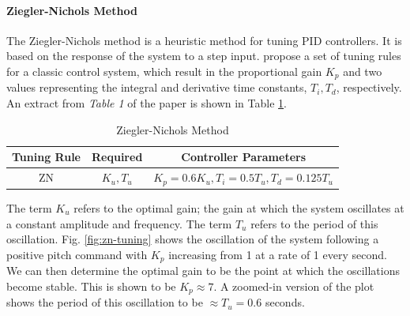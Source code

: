 \documentclass[12pt]{article}
\begin{document}
\paragraph{Ziegler-Nichols Method}
The Ziegler-Nichols method is a heuristic method for tuning PID controllers. It is based on the response of the system to a step input. \citet{McCormack} propose a set of tuning rules for a classic control system, which result in the proportional gain $K_p$ and two values representing the integral and derivative time constants, $T_i,T_d$, respectively. An extract from \emph{Table 1} of the paper is shown in Table \ref{tab:zn}.

\begin{table}[ht]
    \centering
    \begin{tabular}{c|c|c}
        \hline
        Tuning Rule & Required & Controller Parameters \\
        \hline
        ZN & \(K_u, T_u\) & \(K_p = 0.6K_u, T_i = 0.5T_u, T_d = 0.125T_u\) \\
        \hline
    \end{tabular}
    \caption{Ziegler-Nichols Method}
    \label{tab:zn}
\end{table}

The term $K_u$ refers to the optimal gain; the gain at which the system oscillates at a constant amplitude and frequency. The term $T_u$ refers to the period of this oscillation. Fig. \ref{fig:zn-tuning} shows the oscillation of the system following a positive pitch command with $K_p$ increasing from 1 at a rate of 1 every second. We can then determine the optimal gain to be the point at which the oscillations become stable. This is shown to be $K_p \approx 7$. A zoomed-in version of the plot shows the period of this oscillation to be $\approx T_u = 0.6$ seconds.
\end{document}
